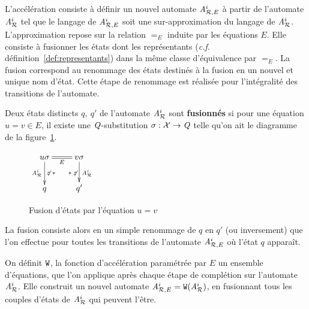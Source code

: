 L'accélération consiste à définir un nouvel automate ${\mathit A}_{\mathcal R,E}^i$ à partir de l'automate ${\mathit A}_{\mathcal R}^i$ tel 
que le langage de ${\mathit A}_{\mathcal R,E}^i$ soit une sur-approximation du langage de ${\mathit A}_{\mathcal R}^i$.
L'approximation repose sur la relation $=_E$ induite par les équations $E$. 
Elle consiste à fusionner les états dont les représentants (\textit{c.f.} définition~\ref{def:representants})
dans la même classe d'équivalence par $=_E$. La fusion correspond au renommage des états destinés à la fusion
en un nouvel et unique nom d'état. Cette étape de renommage est réalisée pour l'intégralité des transitions de l'automate.
\begin{definition}
  Deux états distincts $q,\ q'$ de l'automate ${\mathit A}_{\mathcal R}^i$ sont \textbf{fusionnés} si pour une équation $u=v \in E$,
  il existe une $\mathit Q$-substitution $\sigma : \mathcal X \rightarrow \mathit Q$ telle qu'on ait le diagramme de la figure~\ref{fig:fusion}.
  \begin{figure}[ht!]
    \centering
    $\xymatrix{
      u\sigma \ar@{=}[r]_{E}\ar[d]_{\aaex^i}^{\not\varepsilon\; *} & v\sigma \ar[d]_{*\; \not\varepsilon}^{\aaex^i}\\
      q & q'
    } $
    \caption{Fusion d'états par l'équation $u=v$}
    \label{fig:fusion}
  \end{figure}

  La fusion consiste alors en un simple renommage de $q$ en $q'$ (ou inversement) que l'on effectue
  pour toutes les transitions de l'automate ${\mathit A}_{\mathcal R,E}^i$ où l'état $q$ apparaît.
\end{definition}


\begin{definition}
  On définit $\mathtt{W}$, la fonction d'accélération paramétrée par $E$ un ensemble d'équations, 
  que l'on applique après chaque étape de complétion sur l'automate ${\mathit A}_{\mathcal R}^i$. Elle construit
  un nouvel automate ${\mathit A}_{\mathcal R,E}^i = \mathtt{W}({\mathit A}_{\mathcal R}^i)$, en fusionnant tous les couples d'états de ${\mathit A}_{\mathcal R}^i$
  qui peuvent l'être.
\end{definition}


